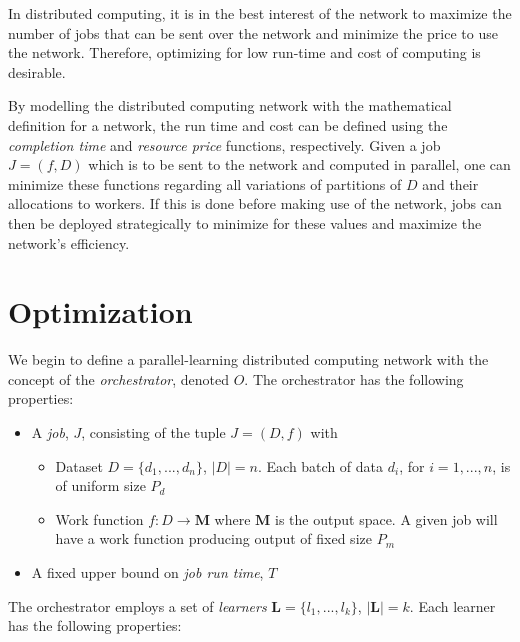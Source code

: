 \documentclass[../mthe-493-final-project.tex]{subfiles}
\begin{document}
    In distributed computing, it is in the best interest of the network to maximize the number of jobs that can be sent over the network and minimize the price to use the network. Therefore, optimizing for low run-time and cost of computing is desirable.

    By modelling the distributed computing network with the mathematical definition for a network, the run time and cost can be defined using the \textit{completion time} and \textit{resource price} functions, respectively. Given a job $J = (f,D)$ which is to be sent to the network and computed in parallel, one can minimize these functions regarding all variations of partitions of $D$ and their allocations to workers. If this is done before making use of the network, jobs can then be deployed strategically to minimize for these values and maximize the network's efficiency.

    \section{Optimization}
    \label{sec:optimization-problem-description}

    We begin to define a parallel-learning distributed computing network with the concept of the \textit{orchestrator}, denoted $O$. The orchestrator has the following properties:

    \begin{itemize}
        
        \item A \textit{job}, $J$, consisting of the tuple $J = (D, f)$ with
             \begin{itemize}
                  \item Dataset $D = \{d_1, ..., d_n\}$, $\vert D\vert = n$. Each batch of data $d_i$, for $i = 1,...,n$, is of uniform size $P_d$
                  \item Work function $f: D \rightarrow \mathbf{M}$ where $\mathbf{M}$ is the output space. A given job will have a work function producing output of fixed size $P_m$
              \end{itemize}
        \item A fixed upper bound on \textit{job run time}, $T$
    \end{itemize}
    
    The orchestrator employs a set of \textit{learners} $\mathbf{L} = \{l_1, ..., l_k\}$, $\vert\mathbf{L}\vert = k$. Each learner has the following properties:
    
\end{document}
